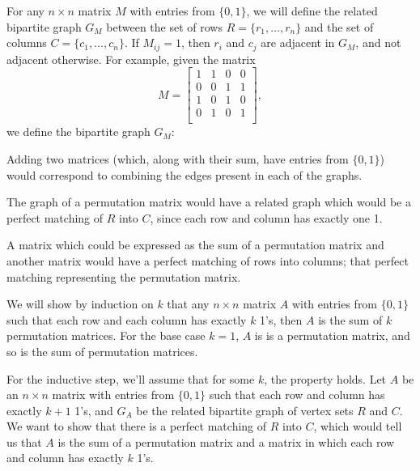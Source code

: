 \documentclass[12pt]{article}
\begin{document}
For any $n\times n$ matrix $M$ with entries from $\{0,1\}$, we will define the related bipartite graph $G_M$ between the set of rows $R=\{r_1,\dots,r_n\}$ and the set of columns $C=\{c_1,\dots,c_n\}$. If $M_{ij} = 1$, then $r_i$ and $c_j$ are adjacent in $G_M$, and not adjacent otherwise. For example, given the matrix
\[M = \begin{bmatrix}
    1 & 1 & 0 & 0 \\
    0 & 0 & 1 & 1 \\
    1 & 0 & 1 & 0 \\
    0 & 1 & 0 & 1 \\
\end{bmatrix},\]
we define the bipartite graph $G_M$:
\begin{center}
\end{center}

Adding two matrices (which, along with their sum, have entries from $\{0,1\}$) would correspond to combining the edges present in each of the graphs.

The graph of a permutation matrix would have a related graph which would be a perfect matching of $R$ into $C$, since each row and column has exactly one 1.

A matrix which could be expressed as the sum of a permutation matrix and another matrix would have a perfect matching of rows into columns; that perfect matching representing the permutation matrix.

We will show by induction on $k$ that any $n\times n$ matrix $A$ with entries from $\{0,1\}$ such that each row and each column has exactly $k$ 1's, then $A$ is the sum of $k$ permutation matrices. For the base case $k=1$, $A$ is is a permutation matrix, and so is the sum of permutation matrices.

For the inductive step, we'll assume that for some $k$, the property holds. Let $A$ be an $n\times n$ matrix with entries from $\{0,1\}$ such that each row and column has exactly $k+1$ 1's, and $G_A$ be the related bipartite graph of vertex sets $R$ and $C$. We want to show that there is a perfect matching of $R$ into $C$, which would tell us that $A$ is the sum of a permutation matrix and a matrix in which each row and column has exactly $k$ 1's. 
\end{document}
